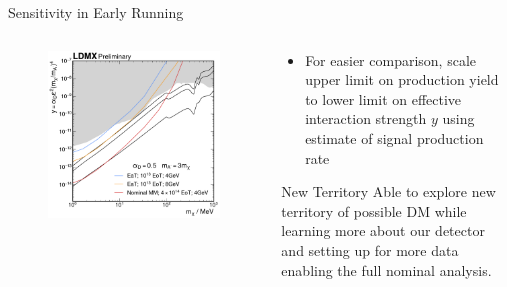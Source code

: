 \documentclass[aspectratio=169]{beamer}
\begin{document}
\begin{frame}{Sensitivity in Early Running}
  \begin{columns}
    \begin{column}{0.45\textwidth}
      \begin{figure}
        \centering
        \includegraphics[width=\textwidth]{../figures/ldmx/analysis/reach.pdf}
      \end{figure}
    \end{column}
    \begin{column}{0.55\textwidth}
      \begin{itemize}
        \item For easier comparison, scale upper limit on production yield
          to lower limit on effective interaction strength $y$ using
          estimate of signal production rate
      \end{itemize}
      \vfill 
      \begin{block}{New Territory}
        Able to explore new territory of possible DM while
        learning more about our detector and setting up for
        more data enabling the full nominal analysis.
      \end{block}
    \end{column}
  \end{columns}
\end{frame}
\end{document}
